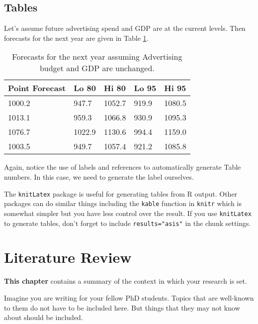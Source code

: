 \documentclass{aucklandthesis}
\begin{document}
\hypertarget{tables}{%
\section{Tables}\label{tables}}

Let's assume future advertising spend and GDP are at the current levels. Then forecasts for the next year are given in Table \ref{tab:salesforecasts}.

\begin{table}[ht]
\begin{center}
\begin{tabular}{lllll}
\toprule
Point Forecast & Lo 80 & Hi 80 & Lo 95 & Hi 95 \\
\midrule
1000.2 &  947.7 & 1052.7 & 919.9 & 1080.5 \\
1013.1 &  959.3 & 1066.8 & 930.9 & 1095.3 \\
1076.7 & 1022.9 & 1130.6 & 994.4 & 1159.0 \\
1003.5 &  949.7 & 1057.4 & 921.2 & 1085.8 \\
\bottomrule
\end{tabular}
\caption{Forecasts for the next year assuming Advertising budget and GDP are unchanged.}
\label{tab:salesforecasts}
\end{center}
\end{table}

Again, notice the use of labels and references to automatically generate Table numbers. In this case, we need to generate the label ourselves.

The \texttt{knitLatex} package is useful for generating tables from R output. Other packages can do similar things including the \texttt{kable} function in \texttt{knitr} which is somewhat simpler but you have less control over the result. If you use \texttt{knitLatex} to generate tables, don't forget to include \texttt{results="asis"} in the chunk settings.

\hypertarget{ch:litreview}{%
\chapter{Literature Review}\label{ch:litreview}}

\textbf{This chapter} contains a summary of the context in which your research is set.

Imagine you are writing for your fellow PhD students. Topics that are well-known to them do not have to be included here. But things that they may not know about should be included.
\end{document}
